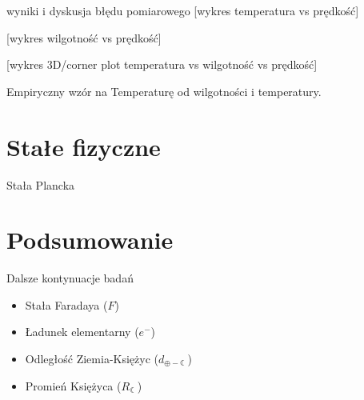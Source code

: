 \documentclass{beamer}
\begin{document}
\begin{frame}{wyniki i dyskusja błędu pomiarowego}
[wykres temperatura vs prędkość]

[wykres wilgotność vs prędkość]

[wykres 3D/corner plot temperatura vs wilgotność vs prędkość]

Empiryczny wzór na Temperaturę od wilgotności i temperatury.
\end{frame}


\section{Stałe fizyczne}

\begin{frame}{Stała Plancka}

\end{frame}


\section{Podsumowanie}

\begin{frame}{Dalsze kontynuacje badań}
\begin{itemize}
\item Stała Faradaya ($F$)
\item Ładunek elementarny ($e^-$)
\item Odległość Ziemia-Księżyc ($d_{\oplus - \leftmoon}$)
\item Promień Księżyca ($R_{\leftmoon}$)
\end{itemize}

\end{frame}
\end{document}
